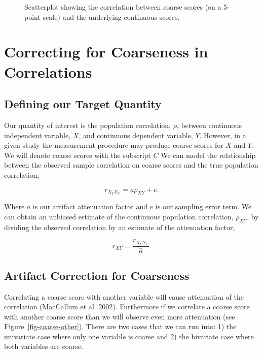 \documentclass[
  letterpaper,
  DIV=11,
  numbers=noendperiod]{scrreprt}
\begin{document}
\begin{figure}[H]


\caption{\label{fig-coarse-self}Scatterplot showing the correlation
between coarse scores (on a 5-point scale) and the underlying continuous
scores.}

\end{figure}%

\section{Correcting for Coarseness in
Correlations}\label{correcting-for-coarseness-in-correlations}

\subsection{Defining our Target
Quantity}\label{defining-our-target-quantity-2}

Our quantity of interest is the population correlation, \(\rho\),
between continuous independent variable, \(X\), and continuous dependent
variable, \(Y\). However, in a given study the measurement procedure may
produce coarse scores for \(X\) and \(Y\). We will denote coarse scores
with the subscript \(C\) We can model the relationship between the
observed sample correlation on coarse scores and the true population
correlation,

\[
r_{X_CY_C} = a\rho_{XY}+e.
\]

Where \(a\) is our artifact attenuation factor and \(e\) is our sampling
error term. We can obtain an unbiased estimate of the continuous
population correlation, \(\rho_{XY}\), by dividing the observed
correlation by an estimate of the attenuation factor,

\[
r_{XY} = \frac{r_{X_CY_C}}{\hat{a}}.
\]

\subsection{Artifact Correction for Coarseness}\label{sec-coarse-cor}

Correlating a coarse score with another variable will cause attenuation
of the correlation (MacCallum et al. 2002). Furthermore if we correlate
a coarse score with another coarse score than we will observe even more
attenuation (see Figure~\ref{fig-coarse-other}). There are two cases
that we can run into: 1) the univariate case where only one variable is
coarse and 2) the bivariate case where both variables are coarse.
\end{document}

